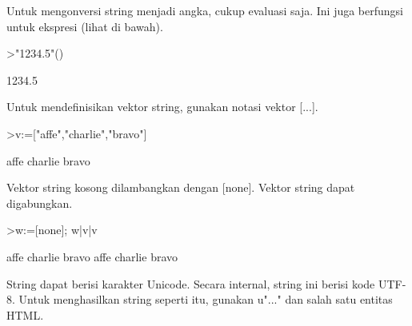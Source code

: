 \documentclass{article}
\begin{document}
\begin{eulernotebook}
\begin{eulercomment}
\begin{eulercomment}
\begin{eulercomment}
Untuk mengonversi string menjadi angka, cukup evaluasi saja. Ini juga
berfungsi untuk ekspresi (lihat di bawah).
\end{eulercomment}
\begin{eulerprompt}
>"1234.5"()
\end{eulerprompt}
\begin{euleroutput}
  1234.5
\end{euleroutput}
\begin{eulercomment}
Untuk mendefinisikan vektor string, gunakan notasi vektor [...].
\end{eulercomment}
\begin{eulerprompt}
>v:=["affe","charlie","bravo"]
\end{eulerprompt}
\begin{euleroutput}
  affe
  charlie
  bravo
\end{euleroutput}
\begin{eulercomment}
Vektor string kosong dilambangkan dengan [none]. Vektor string dapat
digabungkan.
\end{eulercomment}
\begin{eulerprompt}
>w:=[none]; w|v|v
\end{eulerprompt}
\begin{euleroutput}
  affe
  charlie
  bravo
  affe
  charlie
  bravo
\end{euleroutput}
\begin{eulercomment}
String dapat berisi karakter Unicode. Secara internal, string ini
berisi kode UTF-8. Untuk menghasilkan string seperti itu, gunakan
u"..." dan salah satu entitas HTML.


\end{eulercomment}
\end{eulercomment}
\end{eulercomment}
\end{eulernotebook}
\end{document}
